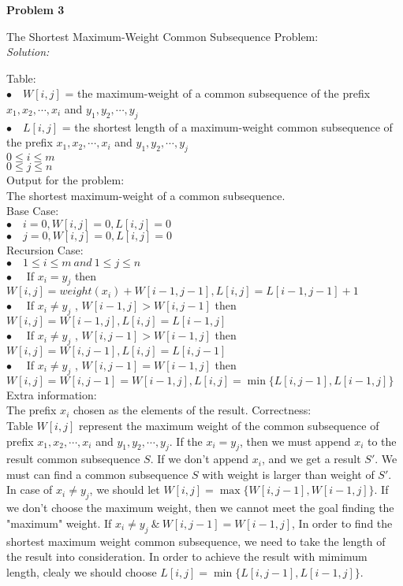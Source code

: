 \documentclass[12pt,letterpaper]{article}
\def\pp{\par\noindent}
\newcommand{\problem}[1]{ \bigskip \pp \textbf{Problem #1}\par}
\newcommand{\solution}{\textit{Solution:}\par}
\begin{document}
\problem{3}
The Shortest Maximum-Weight Common Subsequence Problem: \\
\solution
Table: \\
$\bullet \quad W[i,j]$ = the maximum-weight of a common subsequence of the prefix $x_1,x_2,\cdots,x_i$ and $y_1,y_2,\cdots,y_j$ \\
$\bullet \quad L[i,j]$ = the shortest length of a maximum-weight common subsequence of the prefix $x_1,x_2,\cdots,x_i$ and $y_1,y_2,\cdots,y_j$ \\
$ 0 \le i \le m $ \\
$ 0 \le j \le n $ \\
Output for the problem: \\
The shortest maximum-weight of a common subsequence. \\
Base Case: \\
$\bullet \quad i = 0, W[i,j] = 0, L[i,j] = 0$ \\
$\bullet \quad j = 0, W[i,j] = 0, L[i,j] = 0$ \\
Recursion Case: \\
$\bullet \quad 1 \le i \le m\  and\ 1 \le j \le n$ \\
$\bullet \quad $ If $x_i = y_j $ then $ W[i,j] = weight(x_i) + W[i-1,j-1] , L[i,j] = L[i-1,j-1] + 1$ \\
$\bullet \quad $ If $x_i \neq y_j $ , $W[i-1,j] > W[i,j-1] $ then $W[i,j] = W[i-1,j], L[i,j] = L[i-1,j]$ \\
$\bullet \quad $ If $x_i \neq y_j $ , $W[i,j-1] > W[i-1,j] $ then $W[i,j] = W[i,j-1], L[i,j] = L[i,j-1]$ \\
$\bullet \quad $ If $x_i \neq y_j $ , $W[i,j-1] = W[i-1,j] $ then $W[i,j] = W[i,j-1] = W[i-1,j], L[i,j] = \min \{ L[i,j-1], L[i-1,j] \}$ \\
Extra information: \\
The prefix $x_i$ chosen as the elements of the result.
Correctness: \\
Table $W[i,j]$ represent the maximum weight of the common subsequence of prefix $x_1,x_2,\cdots,x_i$ and $y_1,y_2,\cdots,y_j$. If the $x_i = y_j$, then we must append $x_i$ to the result common subsequence $S$. If we don't append $x_i$, and we get a result $S'$. We must can find a common subsequence $S$ with weight is larger than weight of $S'$. In case of $x_i \neq y_j$, we should let $W[i,j] = \max \{ W[i,j-1], W[i-1,j] \}$. If we don't choose the maximum weight, then we cannot meet the goal finding the "maximum" weight. If $x_i \neq y_j \ \&\  W[i,j-1] = W[i-1,j]$, In order to find the shortest maximum weight common subsequence, we need to take the length of the result into consideration. In order to achieve the result with mimimum length, clealy we should choose $L[i,j] = \min \{ L[i,j-1], L[i-1,j] \}$. \\
\end{document}
